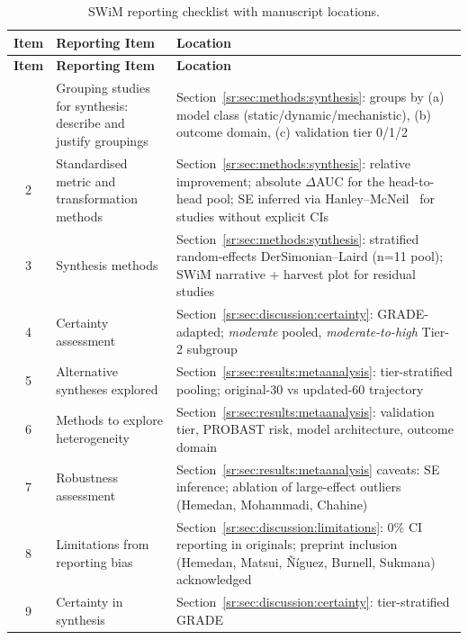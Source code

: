 \small
\begin{longtable}{@{}cp{5cm}p{8.5cm}@{}}
\caption{SWiM reporting checklist with manuscript locations.} \\
\toprule
\textbf{Item} & \textbf{Reporting Item} & \textbf{Location} \\
\midrule
\endfirsthead
\toprule
\textbf{Item} & \textbf{Reporting Item} & \textbf{Location} \\
\midrule
\endhead
\bottomrule
\endlastfoot
1 & Grouping studies for synthesis: describe and justify groupings & Section~\ref{sr:sec:methods:synthesis}: groups by (a) model class (static/dynamic/mechanistic), (b) outcome domain, (c) validation tier 0/1/2 \\
2 & Standardised metric and transformation methods & Section~\ref{sr:sec:methods:synthesis}: relative improvement; absolute $\Delta$AUC for the head-to-head pool; SE inferred via Hanley--McNeil~\cite{hanley1982} for studies without explicit CIs \\
3 & Synthesis methods & Section~\ref{sr:sec:methods:synthesis}: stratified random-effects DerSimonian--Laird (n=11 pool); SWiM narrative + harvest plot for residual studies \\
4 & Certainty assessment & Section~\ref{sr:sec:discussion:certainty}: GRADE-adapted; \emph{moderate} pooled, \emph{moderate-to-high} Tier-2 subgroup \\
5 & Alternative syntheses explored & Section~\ref{sr:sec:results:metaanalysis}: tier-stratified pooling; original-30 vs updated-60 trajectory \\
6 & Methods to explore heterogeneity & Section~\ref{sr:sec:results:metaanalysis}: validation tier, PROBAST risk, model architecture, outcome domain \\
7 & Robustness assessment & Section~\ref{sr:sec:results:metaanalysis} caveats: SE inference; ablation of large-effect outliers (Hemedan, Mohammadi, Chahine) \\
8 & Limitations from reporting bias & Section~\ref{sr:sec:discussion:limitations}: 0\% CI reporting in originals; preprint inclusion (Hemedan, Matsui, \~{N}\'{i}guez, Burnell, Sukmana) acknowledged \\
9 & Certainty in synthesis & Section~\ref{sr:sec:discussion:certainty}: tier-stratified GRADE \\
\end{longtable}
\normalsize

